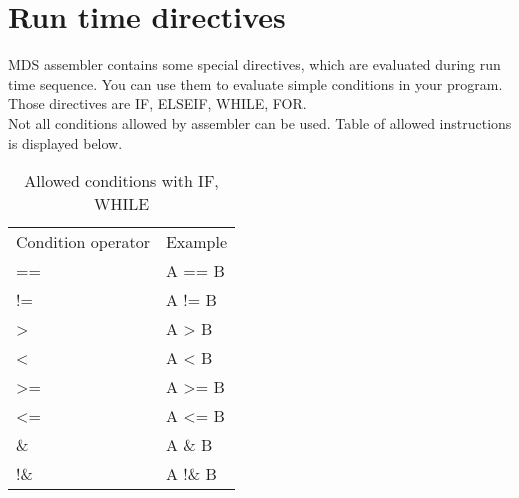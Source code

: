 {        \section{Run time directives}
        MDS assembler contains some special directives, which are evaluated during run time sequence. You can use them to evaluate simple conditions in your program.
        Those directives are IF, ELSEIF, WHILE, FOR.\\ Not all conditions allowed by assembler can be used.
        Table of allowed instructions is displayed below.
            \begin{table}[h!]
                    \mysmallfont{}
                    \centering{}
                    \begin{tabular}{|l|l}
                    \hline
                    Condition operator       &          Example  \\
                    ==                       &          A ==  B  \\
                    !=                       &          A !=  B  \\
                    >                        &          A >   B  \\
                    <                        &          A <   B  \\
                    >=                       &          A >=  B  \\
                    <=                       &          A <=  B  \\
                    \&                       &          A \&  B  \\
                    !\&                      &          A !\& B
                    \end{tabular}
                    \caption{Allowed conditions with IF, WHILE}
            \end{table}

}
